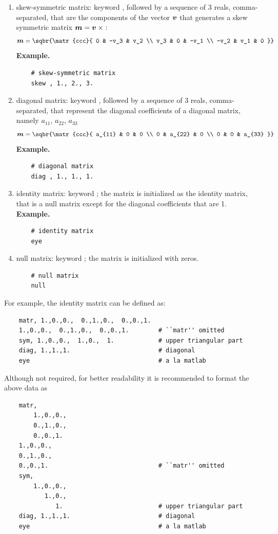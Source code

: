 \begin{enumerate}
    \item skew-symmetric matrix: keyword , followed by a sequence
    of 3 reals, comma-separated, that are the components of the vector $\boldsymbol{v}$
    that generates a skew symmetric matrix $\boldsymbol{m}=\boldsymbol{v}\times{}$:
\begin{equation}
	\T{m} = \sqbr{\matr{ccc}{
		0 & -v_3 & v_2 \\
		v_3 & 0 & -v_1 \\
		-v_2 & v_1 & 0
	}}
\end{equation}
\textbf{Example.}
\begin{verbatim}
    # skew-symmetric matrix
    skew , 1., 2., 3.
\end{verbatim}

    \item diagonal matrix: keyword , followed by a sequence
    of 3 reals, comma-separated, that represent the diagonal coefficients 
    of a diagonal matrix, namely $a_{11}$, $a_{22}$, $a_{33}$
\begin{equation}
	\T{m} = \sqbr{\matr{ccc}{
		a_{11} & 0 & 0 \\
		0 & a_{22} & 0 \\
		0 & 0 & a_{33}
	}}
\end{equation}
\textbf{Example.}
\begin{verbatim}
    # diagonal matrix
    diag , 1., 1., 1.
\end{verbatim}

    \item identity matrix: keyword ; the matrix is initialized
    as the identity matrix, that is a null matrix except for the diagonal 
    coefficients that are 1.
\textbf{Example.}
\begin{verbatim}
    # identity matrix
    eye
\end{verbatim}

    \item null matrix: keyword ; the matrix is initialized 
    with zeros.
\begin{verbatim}
    # null matrix
    null 
\end{verbatim}

\end{enumerate}
For example, the identity matrix can be defined as:
\begin{verbatim}
    matr, 1.,0.,0.,  0.,1.,0.,  0.,0.,1.
    1.,0.,0.,  0.,1.,0.,  0.,0.,1.        # ``matr'' omitted
    sym, 1.,0.,0.,  1.,0.,  1.            # upper triangular part
    diag, 1.,1.,1.                        # diagonal
    eye                                   # a la matlab
\end{verbatim}
Although not required, for better readability it is recommended to format
the above data as
\begin{verbatim}
    matr,
        1.,0.,0.,
        0.,1.,0.,
        0.,0.,1.
    1.,0.,0.,
    0.,1.,0.,
    0.,0.,1.                              # ``matr'' omitted
    sym,
        1.,0.,0.,
           1.,0.,
              1.                          # upper triangular part
    diag, 1.,1.,1.                        # diagonal
    eye                                   # a la matlab
\end{verbatim}

